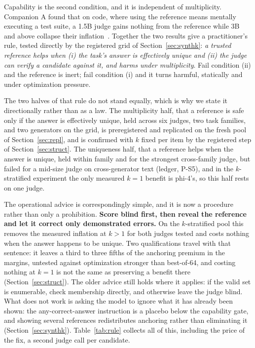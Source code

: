 \documentclass[11pt]{article}
\begin{document}
Capability is the second condition, and it is independent of multiplicity.
Companion A found that on code, where using the reference means mentally executing a test suite, a 1.5B judge gains nothing from the reference while 3B and above collapse their inflation~\cite{companionA}.
Together the two results give a practitioner's rule, tested directly by the registered grid of Section~\ref{sec:synthk}: \emph{a trusted reference helps when (i) the task's answer is effectively unique and (ii) the judge can verify a candidate against it, and harms under multiplicity}.
Fail condition (ii) and the reference is inert; fail condition (i) and it turns harmful, statically and under optimization pressure.

The two halves of that rule do not stand equally, which is why we state it directionally rather than as a law.
The multiplicity half, that a reference is safe only if the answer is effectively unique, held across six judges, two task families, and two generators on the grid, is preregistered and replicated on the fresh pool of Section~\ref{sec:repl}, and is confirmed with $k$ fixed per item by the registered step of Section~\ref{sec:struct}.
The uniqueness half, that a reference helps when the answer is unique, held within family and for the strongest cross-family judge, but failed for a mid-size judge on cross-generator text (ledger, P-S5), and in the $k$-stratified experiment the only measured $k{=}1$ benefit is phi-4's, so this half rests on one judge.

The operational advice is correspondingly simple, and it is now a procedure rather than only a prohibition.
\textbf{Score blind first, then reveal the reference and let it correct only demonstrated errors.}
On the $k$-stratified pool this removes the measured inflation at $k > 1$ for both judges tested and costs nothing when the answer happens to be unique.
Two qualifications travel with that sentence: it leaves a third to three fifths of the anchoring premium in the margins, untested against optimization stronger than best-of-64, and costing nothing at $k{=}1$ is not the same as preserving a benefit there (Section~\ref{sec:struct}).
The older advice still holds where it applies: if the valid set is enumerable, check membership directly, and otherwise leave the judge blind.
What does not work is asking the model to ignore what it has already been shown: the any-correct-answer instruction is a placebo below the capability gate, and showing several references redistributes anchoring rather than eliminating it (Section~\ref{sec:synthk}).
Table~\ref{tab:rule} collects all of this, including the price of the fix, a second judge call per candidate.
\end{document}

